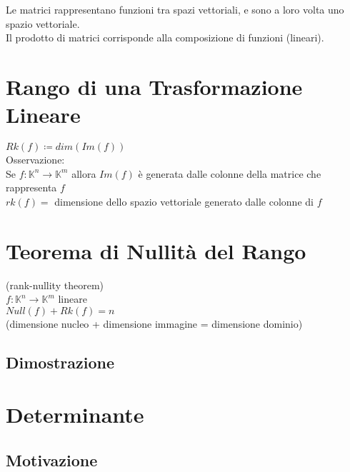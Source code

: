 \documentclass[a4paper, twoside, italian, 11pt]{book}
\newcommand{\K}{\mathbb K}
\begin{document}
\noindent
Le matrici rappresentano funzioni tra spazi vettoriali, e sono a loro volta uno spazio vettoriale.\\

\noindent
Il prodotto di matrici corrisponde alla composizione di funzioni (lineari).



\section{Rango di una Trasformazione Lineare}

$Rk(f) \coloneqq dim(Im(f))$ \\

\noindent
Osservazione: \\

\noindent
Se $f : \K^n \rightarrow \K^m$ allora $Im(f)$ è generata dalle colonne della matrice che rappresenta $f$ \\

\noindent
$rk(f) =$ dimensione dello spazio vettoriale generato dalle colonne di $f$



\section{Teorema di Nullità del Rango}

(rank-nullity theorem) \\

\noindent
$f : \K^n \rightarrow \K^m$ lineare \\

$Null(f) + Rk(f) = n$ \\

\noindent
(dimensione nucleo + dimensione immagine = dimensione dominio)


\subsection{Dimostrazione}




\section{Determinante}


\subsection{Motivazione}
\end{document}

